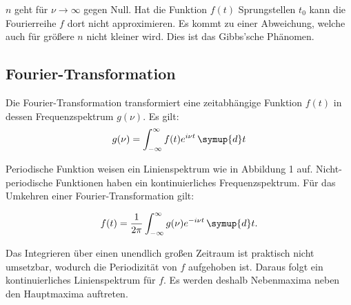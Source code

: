 $n$ geht für $\nu \to \infty$ gegen Null.
Hat die Funktion $f(t)$ Sprungstellen $t_0$ kann die Fourierreihe $f$ dort nicht approximieren. Es kommt zu einer
Abweichung, welche auch für größere $n$ nicht kleiner wird. Dies ist das Gibbs'sche Phänomen.

\subsection{Fourier-Transformation}
Die Fourier-Transformation transformiert eine zeitabhängige Funktion $f(t)$ in dessen Frequenzspektrum $g(\nu)$. Es gilt:
\begin{equation}
  g(\nu) = \int_{-\infty}^{\infty} f(t) e^{i\nu t} \, \symup{d}t
\end{equation}

Periodische Funktion weisen ein Linienspektrum wie in Abbildung 1 auf. Nicht-periodische Funktionen haben ein
kontinuierliches Frequenzspektrum. Für das Umkehren einer Fourier-Transformation gilt:

\begin{equation}
  f(t) = \frac{1}{2\pi} \int_{-\infty}^{\infty} g(\nu) e^{-i\nu t} \, \symup{d}t .
\end{equation}

Das Integrieren über einen unendlich großen Zeitraum ist praktisch nicht umsetzbar, wodurch die
Periodizität von $f$ aufgehoben ist. Daraus folgt ein kontinuierliches Linienspektrum für $f$.
Es werden deshalb Nebenmaxima neben den Hauptmaxima auftreten.
